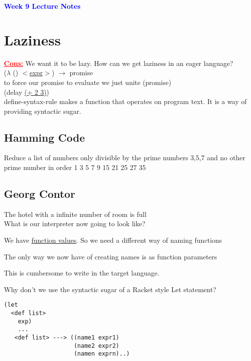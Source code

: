 \documentclass{article}
\begin{document}
\begin{flushleft}
\textcolor{blue}{\textbf{{\huge Week 9 Lecture Notes}}}
\section*{Laziness}
\begin{flushleft}
\textcolor{red}{\textbf{\underline{Cons:}}} We want it to be lazy. How can we get laziness in an eager language?\\

\doublespacing
($\lambda$ () \underline{$<$expr$>$}) $\rightarrow$ promise\\
\doublespacing
to force our promise to evaluate we just unite (promise)\\
\doublespacing
(delay \underline{(+ 2 3)})\\
\doublespacing
define-syntax-rule makes a function that operates on program text. It is a way of providing syntactic sugar.
\end{flushleft}


\subsection*{Hamming Code}
\begin{flushleft}
Reduce a list of numbers only divisible by the prime numbers 3,5,7 and no other prime number in order 1  3  5  7  9  15  21  25  27  35
\end{flushleft}

\subsection*{Georg Contor}
\begin{flushleft}
The hotel with a infinite number of room is full\\

\doublespacing
What is our interpreter now going to look like?

\doublespacing
We have \underline{function values}. So we need a different way of naming functions

\doublespacing
The only way we now have of creating names is as function parameters

\doublespacing
This is cumbersome to write in the target language.

\doublespacing
Why don't we use the syntactic sugar of a Racket style Let statement?
\begin{verbatim}
(let
  <def list>
    exp)
    ...
   <def list> ---> ((name1 expr1)
                    (name2 expr2)
                    (namen exprn)..)


\end{verbatim}
\end{flushleft}
\end{flushleft}
\end{document}
